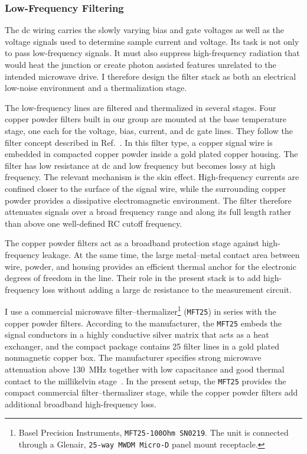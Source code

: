         \subsubsection*{Low-Frequency Filtering}

            The dc wiring carries the slowly varying bias and gate voltages as well as the voltage signals used to determine sample current and voltage. Its task is not only to pass low-frequency signals. It must also suppress high-frequency radiation that would heat the junction or create photon assisted features unrelated to the intended microwave drive. I therefore design the filter stack as both an electrical low-noise environment and a thermalization stage.

            The low-frequency lines are filtered and thermalized in several stages. Four copper powder filters built in our group are mounted at the base temperature stage, one each for the voltage, bias, current, and dc gate lines. They follow the filter concept described in Ref.~\cite{thalmann_comparison_2017}. In this filter type, a copper signal wire is embedded in compacted copper powder inside a gold plated copper housing. The filter has low resistance at dc and low frequency but becomes lossy at high frequency. The relevant mechanism is the skin effect. High-frequency currents are confined closer to the surface of the signal wire, while the surrounding copper powder provides a dissipative electromagnetic environment. The filter therefore attenuates signals over a broad frequency range and along its full length rather than above one well-defined RC cutoff frequency.

            The copper powder filters act as a broadband protection stage against high-frequency leakage. At the same time, the large metal--metal contact area between wire, powder, and housing provides an efficient thermal anchor for the electronic degrees of freedom in the line. Their role in the present stack is to add high-frequency loss without adding a large dc resistance to the measurement circuit.

            I use a commercial microwave filter--thermalizer\footnote{Basel Precision Instruments, \texttt{MFT25-100Ohm SN0219}. The unit is connected through a Glenair, \texttt{25-way MWDM Micro-D} panel mount receptacle.} (\texttt{MFT25}) in series with the copper powder filters. According to the manufacturer, the \texttt{MFT25} embeds the signal conductors in a highly conductive silver matrix that acts as a heat exchanger, and the compact package contains 25 filter lines in a gold plated nonmagnetic copper box. The manufacturer specifies strong microwave attenuation above \qty{130}{\mega\hertz} together with low capacitance and good thermal contact to the millikelvin stage~\cite{basel_precision_mft_2026}. In the present setup, the \texttt{MFT25} provides the compact commercial filter--thermalizer stage, while the copper powder filters add additional broadband high-frequency loss.

